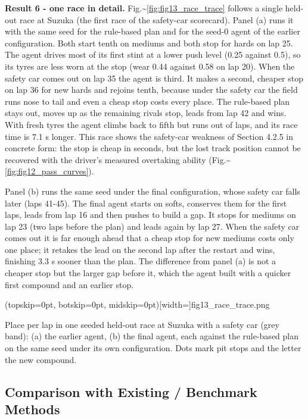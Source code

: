 \documentclass{ieeeaccess}
\begin{document}
\textbf{Result 6 - one race in detail.} Fig.\textasciitilde{}\ref{fig:fig13_race_trace} follows a single held-out race at
Suzuka (the first race of the safety-car scorecard). Panel (a) runs it with the
same seed for the rule-based plan and for the seed-0 agent of the earlier
configuration. Both start tenth on mediums and both stop
for hards on lap 25. The agent drives most of its first stint at a lower push level
(0.25 against 0.5), so its tyres are less worn at the stop (wear 0.44 against 0.58
on lap 20). When the safety car comes out on lap 35 the agent is third. It makes a
second, cheaper stop on lap 36 for new hards and rejoins tenth, because under the
safety car the field runs nose to tail and even a cheap stop costs every place. The
rule-based plan stays out, moves up as the remaining rivals stop, leads from lap 42
and wins. With fresh tyres the agent climbs back to fifth but runs out of laps, and
its race time is 7.1 s longer. This race shows the safety-car weakness of
Section 4.2.5 in concrete form: the stop is cheap in seconds, but the lost track
position cannot be recovered with the driver's measured overtaking ability
(Fig.\textasciitilde{}\ref{fig:fig12_pass_curves}).

Panel (b) runs the same seed under the final configuration, whose safety car falls
later (laps 41-45). The final agent starts on softs, conserves them for the first
laps, leads from lap 16 and then pushes to build a gap. It stops for mediums on
lap 23 (two laps before the plan) and leads again by lap 27. When the safety car
comes out it is far enough ahead that a cheap stop for new mediums costs only one
place; it retakes the lead on the second lap after the restart and wins, finishing
3.3 s sooner than the plan. The difference from panel (a) is not a cheaper stop
but the larger gap before it, which the agent built with a quicker first compound
and an earlier stop.

\Figure[t!](topskip=0pt, botskip=0pt, midskip=0pt)[width=\textwidth]{fig13_race_trace.png}
{\parbox{0.92\textwidth}{Place per lap in one seeded held-out race at Suzuka with a safety car (grey band): (a) the earlier agent, (b) the final agent, each against the rule-based plan on the same seed under its own configuration. Dots mark pit stops and the letter the new compound.}\label{fig:fig13_race_trace}}

\subsection{Comparison with Existing / Benchmark Methods}
\end{document}
